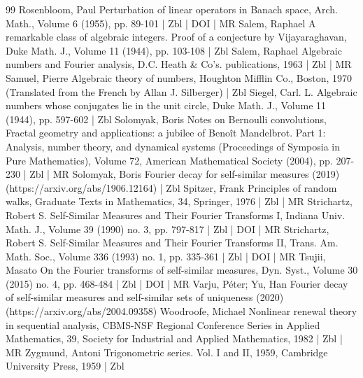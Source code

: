 \documentclass[10pt]{amsart}
\theoremstyle{definition}\newtheorem{defi}[theo]{Definition}\newtheorem{rema}[theo]{Remark}\newtheorem{exam}[theo]{Example}\newtheorem{exem}[theo]{Example}\newtheorem{nota}[theo]{Notation}
\begin{document}
\begin{thebibliography}{99}
Rosenbloom, Paul Perturbation of linear operators in Banach space, Arch. Math., Volume 6 (1955), pp. 89-101 | Zbl | DOI | MR
Salem, Raphael A remarkable class of algebraic integers. Proof of a conjecture by Vijayaraghavan, Duke Math. J., Volume 11 (1944), pp. 103-108 | Zbl
Salem, Raphael Algebraic numbers and Fourier analysis, D.C. Heath \& Co’s. publications, 1963 | Zbl | MR
Samuel, Pierre Algebraic theory of numbers, Houghton Mifflin Co., Boston, 1970 (Translated from the French by Allan J. Silberger) | Zbl
Siegel, Carl. L. Algebraic numbers whose conjugates lie in the unit circle, Duke Math. J., Volume 11 (1944), pp. 597-602 | Zbl
Solomyak, Boris Notes on Bernoulli convolutions, Fractal geometry and applications: a jubilee of Benoît Mandelbrot. Part 1: Analysis, number theory, and dynamical systems (Proceedings of Symposia in Pure Mathematics), Volume 72, American Mathematical Society (2004), pp. 207-230 | Zbl | MR
Solomyak, Boris Fourier decay for self-similar measures (2019) (https://arxiv.org/abs/1906.12164) | Zbl
Spitzer, Frank Principles of random walks, Graduate Texts in Mathematics, 34, Springer, 1976 | Zbl | MR
Strichartz, Robert S. Self-Similar Measures and Their Fourier Transforms I, Indiana Univ. Math. J., Volume 39 (1990) no. 3, pp. 797-817 | Zbl | DOI | MR
Strichartz, Robert S. Self-Similar Measures and Their Fourier Transforms II, Trans. Am. Math. Soc., Volume 336 (1993) no. 1, pp. 335-361 | Zbl | DOI | MR
Tsujii, Masato On the Fourier transforms of self-similar measures, Dyn. Syst., Volume 30 (2015) no. 4, pp. 468-484 | Zbl | DOI | MR
Varju, Péter; Yu, Han Fourier decay of self-similar measures and self-similar sets of uniqueness (2020) (https://arxiv.org/abs/2004.09358)
Woodroofe, Michael Nonlinear renewal theory in sequential analysis, CBMS-NSF Regional Conference Series in Applied Mathematics, 39, Society for Industrial and Applied Mathematics, 1982 | Zbl | MR
Zygmund, Antoni Trigonometric series. Vol. I and II, 1959, Cambridge University Press, 1959 | Zbl
\end{thebibliography}
\end{document}

